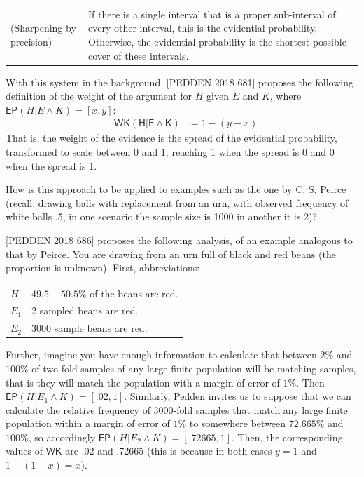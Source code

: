 \documentclass[
  10pt,
  dvipsnames,enabledeprecatedfontcommands]{scrartcl}
\begin{document}
\begin{tabular}{lp{10cm}}
(Sharpening by precision) & If there is a single interval that is a proper sub-interval  of every other interval, this is the evidential probability. Otherwise, the evidential probability is the shortest possible cover of these intervals.
\end{tabular}

With this system in the background, {[}PEDDEN 2018 681{]} proposes the
following definition of the weight of the argument for \(H\) given \(E\)
and \(K\), where \(\mathsf{EP}(H \vert E \wedge K) = [x,y]\):
\begin{align}
\tag{WK} & \mathsf{WK(H\vert E\wedge K)} & = 1 - (y-x)
\end{align} That is, the weight of the evidence is the spread of the
evidential probability, transformed to scale between 0 and 1, reaching 1
when the spread is 0 and 0 when the spread is 1.

How is this approach to be applied to examples such as the one by C. S.
Peirce (recall: drawing balls with replacement from an urn, with
observed frequency of white balls .5, in one scenario the sample size is
1000 in another it is 2)?

{[}PEDDEN 2018 686{]} proposes the following analysis, of an example
analogous to that by Peirce. You are drawing from an urn full of black
and red beans (the proportion is unknown). First, abbreviations:

\begin{tabular}{lp{10cm}}
$H$ & $49.5-50.5\%$ of the beans are red. \\
$E_1$ & 2 sampled beans are red. \\
$E_2$ & 3000 sample beans are red. 
\end{tabular}

\noindent Further, imagine you have enough information to calculate that
between \(2\%\) and \(100\%\) of two-fold samples of any large finite
population will be matching samples, that is they will match the
population with a margin of error of \(1\%\). Then
\(\mathsf{EP}(H \vert E_1 \wedge K) = [.02, 1]\). Similarly, Pedden
invites us to suppose that we can calculate the relative frequency of
3000-fold samples that match any large finite population within a margin
of error of \(1\%\) to somewhere between \(72.665\%\) and \(100\%\), so
accordingly \(\mathsf{EP}(H \vert E_2 \wedge K) = [.72665, 1]\). Then,
the corresponding values of \(\mathsf{WK}\) are .02 and .72665 (this is
because in both cases \(y =1\) and \(1 - (1 -x) = x\)).
\end{document}
